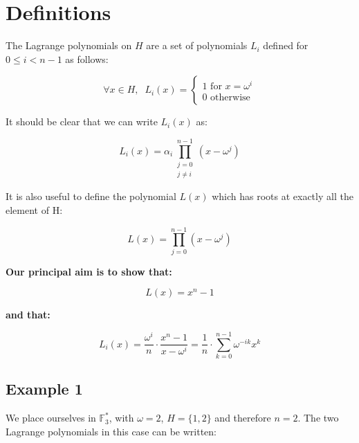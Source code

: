 \documentclass[a4paper]{article}
\begin{document}
\section{Definitions}

The Lagrange polynomials on $H$ are a set of polynomials $L_i$ defined for $0 \le i < n-1$ as follows:

\begin{equation}
    \forall x \in H, \;\; L_i(x) =
    \begin{cases}
      1 \text{   for } x = \omega^i\\
      0 \text{   otherwise}
    \end{cases} 
\end{equation}

It should be clear that we can write $L_i(x)$ as:

\begin{equation}
    L_i(x) = \alpha_i \prod_{\substack{j=0 \\ j \neq i}}^{n-1} (x - \omega^j)
\end{equation}

It is also useful to define the polynomial $L(x)$ which has roots at exactly all the element of H:

\begin{equation}
    L(x) = \prod_{j=0}^{n-1} (x - \omega^j)
\end{equation}

\textbf{Our principal aim is to show that:}

\begin{equation}
    L(x) = x^n - 1
\end{equation}

\textbf{and that:}

\begin{equation}
    L_i(x) = \frac{\omega^i}{n} \cdot \frac{x^n - 1}{x - \omega^i} = \frac{1}{n} \cdot \sum_{k=0}^{n-1} \omega^{-ik} x^k
\end{equation}



\subsection{Example 1}

We place ourselves in $\mathbb{F}_3^{*}$, with $\omega = 2$, $H = \{1, 2\}$ and therefore $n = 2$. The two Lagrange polynomials in this case can be written:
\end{document}
